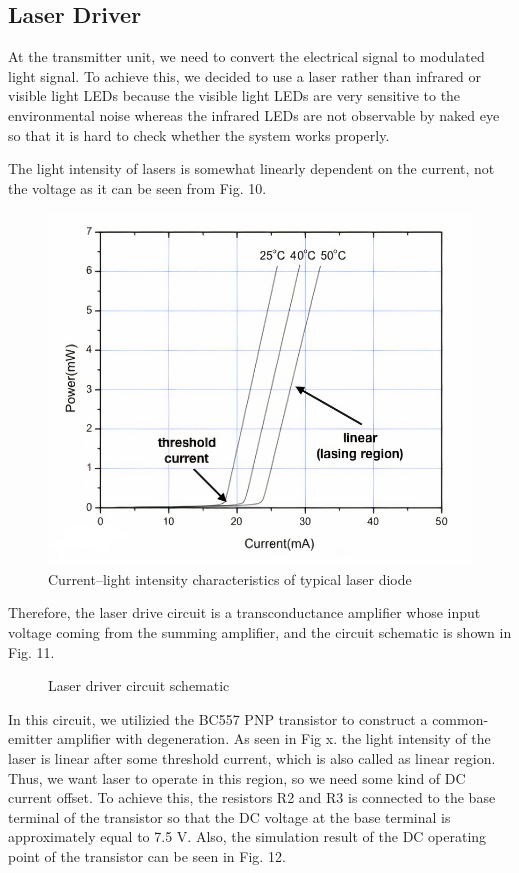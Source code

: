\documentclass[conference]{IEEEtran}
\begin{document}
\subsection{Laser Driver}
At the transmitter unit, we need to convert the electrical signal to modulated light signal. To achieve this, we decided to use a laser rather than infrared or visible light LEDs because the visible light LEDs are very sensitive to the environmental noise whereas the infrared LEDs are not observable by naked eye so that it is hard to check whether the system works properly. \\ 
\par The light intensity of lasers is somewhat linearly dependent on the current, not the voltage as it can be seen from Fig. 10.
 \begin{figure}[H]
   \centerline{\includegraphics[scale=0.5]{laser.png}}
    \caption{Current–light intensity characteristics of typical laser diode}
\end{figure} 
\par Therefore, the laser drive circuit is a transconductance amplifier whose input voltage coming from the summing amplifier, and the circuit schematic is shown in Fig. 11.
 \begin{figure}[H]
   \centerline{}
    \caption{Laser driver circuit schematic}
\end{figure} 
\par In this circuit, we utilizied the BC557 PNP transistor to construct a common-emitter amplifier with degeneration. As seen in Fig x. the light intensity of the laser is linear after some threshold current, which is also called as linear region. Thus, we want laser to operate in this region, so we need some kind of DC current offset. To achieve this, the resistors R2 and R3 is connected to the base terminal of the transistor so that the DC voltage at the base terminal is approximately equal to 7.5 V. Also, the simulation result of the DC operating point of the transistor can be seen in Fig. 12. 
\end{document}
